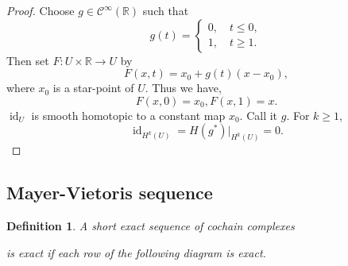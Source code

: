 \documentclass[8pt]{article}
\newtheorem{definition}{Definition}[section]
\DeclareMathOperator{\id}{id}
\newcommand{\R}[0]{\mathbb{R}}
\newcommand{\cinf}[0]{\mathcal{C}^\infty}
\begin{document}
\begin{proof}
  Choose $g\in\cinf(\R)$ such that 
  \begin{equation*}
    g(t) = \begin{cases}
      0,\quad t\leq 0,\\
      1,\quad t\geq 1.
    \end{cases}
  \end{equation*}
  Then set $F:U\times\R\to U$ by 
  \begin{equation*}
    F(x,t) = x_0+g(t)(x-x_0),
  \end{equation*}
  where $x_0$ is a star-point of $U$. Thus we have,
  \begin{equation*}
    F(x,0) = x_0,F(x,1) = x.
  \end{equation*}
  $\id_U$ is smooth homotopic to a constant map $x_0$. Call it $g$. For $k\geq1$,
  \begin{equation*}
    \id_{H^k(U)} = H(g^*)|_{H^k(U)} = 0.
  \end{equation*}
\end{proof}

\subsection{Mayer-Vietoris sequence}

\begin{definition}
  A short exact sequence of cochain complexes
   \begin{center}
  \end{center}
  is exact if each row of the following diagram is exact.
  \begin{center}
  \end{center}
\end{definition}
\end{document}
